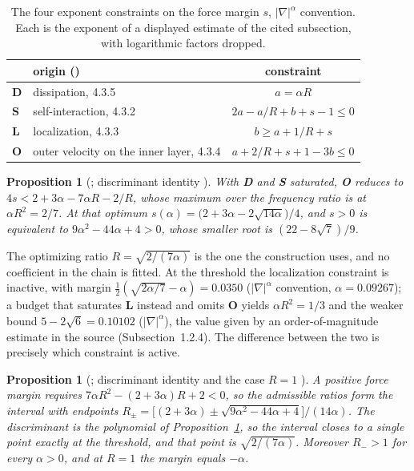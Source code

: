 \documentclass[11pt]{article}
\newtheorem{proposition}[theorem]{Proposition}
\theoremstyle{remark}
\newcommand{\ev}[1]{\hspace{0.2em}{\small\textsf{[#1]}}}
\begin{document}
\begin{table}[t]
\centering
\begin{tabular}{llc}
\toprule
 & origin (\cite{cmz}) & constraint \\
\midrule
\textbf{D} & dissipation, 4.3.5 & $a=\alpha R$ \\
\textbf{S} & self-interaction, 4.3.2 & $2a-a/R+b+s-1\le0$ \\
\textbf{L} & localization, 4.3.3 & $b\ge a+1/R+s$ \\
\textbf{O} & outer velocity on the inner layer, 4.3.4 & $a+2/R+s+1-3b\le0$ \\
\bottomrule
\end{tabular}
\caption{The four exponent constraints on the force margin $s$, $|\nabla|^{\alpha}$ convention.
Each is the exponent of a displayed estimate of the cited subsection, with logarithmic factors
dropped. \ev{V}}\label{tab:constraints}
\end{table}

\begin{proposition}[\ev{D}; discriminant identity \ev{MV}]\label{prop:threshold}
With \textbf{D} and \textbf{S} saturated, \textbf{O} reduces to $4s<2+3\alpha-7\alpha R-2/R$, whose
maximum over the frequency ratio is at $\alpha R^{2}=2/7$. At that optimum
$s(\alpha)=\bigl(2+3\alpha-2\sqrt{14\alpha}\bigr)/4$, and $s>0$ is equivalent to
$9\alpha^{2}-44\alpha+4>0$, whose smaller root is $(22-8\sqrt7)/9$.
\end{proposition}

The optimizing ratio $R=\sqrt{2/(7\alpha)}$ is the one the construction uses, and no coefficient in
the chain is fitted. At the threshold the localization constraint is inactive, with margin
$\tfrac12(\sqrt{2\alpha/7}-\alpha)=0.0350$ ($|\nabla|^{\alpha}$ convention, $\alpha=0.09267$);
a budget that saturates \textbf{L} instead and omits
\textbf{O} yields $\alpha R^{2}=1/3$ and the weaker bound $5-2\sqrt6=0.10102$ ($|\nabla|^{\alpha}$), the value given by an
order-of-magnitude estimate in the source (Subsection~1.2.4). The difference between the two is precisely which
constraint is active.

\begin{proposition}[\ev{D}; discriminant identity and the case $R=1$ \ev{MV}]\label{prop:ratios}
A positive force margin requires $7\alpha R^{2}-(2+3\alpha)R+2<0$, so the admissible ratios form the
interval with endpoints
$R_{\pm}=\bigl[(2+3\alpha)\pm\sqrt{9\alpha^{2}-44\alpha+4}\bigr]/(14\alpha)$. The discriminant is the
polynomial of Proposition~\ref{prop:threshold}, so the interval closes to a single point exactly at the
threshold, and that point is $\sqrt{2/(7\alpha)}$. Moreover $R_{-}>1$ for every $\alpha>0$, and at
$R=1$ the margin equals $-\alpha$.
\end{proposition}
\end{document}
